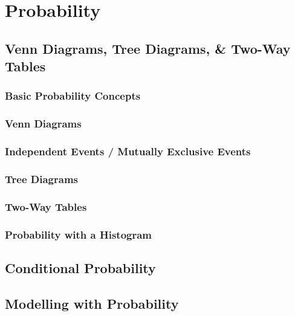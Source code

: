 \documentclass[../alevelmaths.tex]{subfiles}
\begin{document}
\chapter{Probability}
\section{Venn Diagrams, Tree Diagrams, \& Two-Way Tables}
\subsection*{Basic Probability Concepts}
\subsection*{Venn Diagrams}
\subsection*{Independent Events / Mutually Exclusive Events}
\subsection*{Tree Diagrams}
\subsection*{Two-Way Tables}
\subsection*{Probability with a Histogram}
\section{Conditional Probability}
\section{Modelling with Probability}
\end{document}
